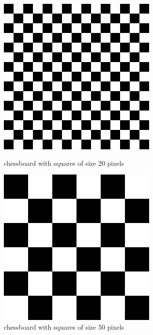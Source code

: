 \begin{figure}[h]
	\centering
	\begin{minipage}{0.45\textwidth}
		\centering
		\includegraphics[width=\linewidth]{images/source/task5/3}
		\caption{chessboard with squares of size 20 pixels}
		\label{fig:1a}
        \end{minipage}
        \hspace{0.05\textwidth}
        \begin{minipage}{0.45\textwidth}
        		\centering
		\includegraphics[width=\linewidth]{images/source/task5/4}
		\caption{chessboard with squares of size 50 pixels}
		\label{fig:1b}
        \end{minipage}
\end{figure}



